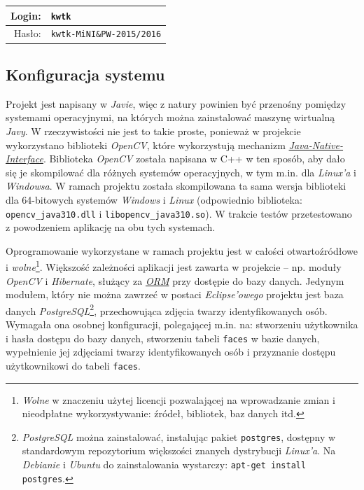 \documentclass[a4paper,titlepage]{article}
\theoremstyle{break}
\numberwithin{equation}{subsection}
\begin{document}
\begin{tabular}{r|l}
Login: & \texttt{kwtk}\\
\hline
Hasło: & \texttt{kwtk-MiNI\&PW-2015/2016}\\
\end{tabular}


\subsection{Konfiguracja systemu}

Projekt jest napisany w \emph{Javie}, więc z natury powinien być przenośny pomiędzy systemami operacyjnymi, na których można zainstalować maszynę wirtualną \emph{Javy}. W rzeczywistości nie jest to takie proste, ponieważ w projekcie wykorzystano biblioteki \emph{OpenCV}, które wykorzystują mechanizm \href{https://en.wikipedia.org/wiki/Java_Native_Interface}{\emph{Java-Native-Interface}}. Biblioteka \emph{OpenCV} została napisana w C++ w ten sposób, aby dało się je skompilować dla różnych systemów operacyjnych, w tym m.in. dla \emph{Linux'a} i \emph{Windowsa}. W ramach projektu została skompilowana ta sama wersja biblioteki dla 64-bitowych systemów \emph{Windows} i \emph{Linux} (odpowiednio biblioteka: \texttt{opencv\_java310.dll} i \texttt{libopencv\_java310.so}). W trakcie testów przetestowano z powodzeniem aplikację na obu tych systemach.

Oprogramowanie wykorzystane w ramach projektu jest w całości otwartoźródłowe i \emph{wolne}\footnote{\emph{Wolne} w znaczeniu użytej licencji pozwalającej na wprowadzanie zmian i nieodpłatne wykorzystywanie: źródeł, bibliotek, baz danych itd.}. Większość zależności aplikacji jest zawarta w projekcie -- np. moduły \emph{OpenCV} i \emph{Hibernate}, służący za \href{https://en.wikipedia.org/wiki/Object-relational_mapping}{\emph{ORM}} przy dostępie do bazy danych. Jedynym modułem, który nie można zawrzeć w postaci \emph{Eclipse'owego} projektu jest baza danych \emph{PostgreSQL}\footnote{\emph{PostgreSQL} można zainstalować, instalując pakiet \texttt{postgres}, dostępny w standardowym repozytorium większości znanych dystrybucji \emph{Linux'a}. Na \emph{Debianie} i \emph{Ubuntu} do zainstalowania wystarczy: \texttt{apt-get install postgres}.}, przechowująca zdjęcia twarzy identyfikowanych osób. Wymagała ona osobnej konfiguracji, polegającej m.in. na: stworzeniu użytkownika i hasła dostępu do bazy danych, stworzeniu tabeli \texttt{faces} w bazie danych, wypełnienie jej zdjęciami twarzy identyfikowanych osób i przyznanie dostępu użytkownikowi do tabeli \texttt{faces}.
\end{document}
